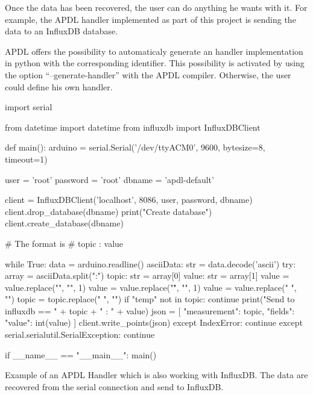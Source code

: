 Once the data has been recovered, the user can do anything he wants with it. For
example, the \gls{APDL} handler implemented as part of this project is sending
the data to an InfluxDB database\cite{InfluxData}.

APDL offers the possibility to automaticaly generate an handler implementation
in python with the corresponding identifier. This possibility is activated by
using the option ``--generate-handler'' with the \gls{APDL} compiler. Otherwise,
the user could define his own handler.

\begin{listing}[ht]
  \centering
\begin{pythoncode}
import serial

from datetime import datetime
from influxdb import InfluxDBClient


def main():
    arduino = serial.Serial('/dev/ttyACM0', 9600, bytesize=8, timeout=1)

    user = 'root'
    password = 'root'
    dbname = 'apdl-default'

    client = InfluxDBClient('localhost', 8086, user, password, dbname)
    client.drop_database(dbname)
    print("Create database")
    client.create_database(dbname)

    # The format is
    # topic : value

    while True:
        data = arduino.readline()
        asciiData: str = data.decode('ascii')
        try:
            array = asciiData.split(":")
            topic: str = array[0]
            value: str = array[1]
            value = value.replace("\n", "", 1)
            value = value.replace("\r", "", 1)
            value = value.replace(" ", "")
            topic = topic.replace(" ", "")
            if "temp" not in topic:
                continue
            print("Send to influxdb == " + topic + " : " + value)
            json = [
                {
                    "measurement": topic,
                    "fields": {
                        "value": int(value)
                    }
                }
            ]
            client.write_points(json)
        except IndexError:
            continue
        except serial.serialutil.SerialException:
            continue

if __name__ == "__main__":
    main()
\end{pythoncode}
  \caption[Example of an APDL Serial Handler with InfluxDB]{Example of an
\gls{APDL} Handler which is also working with InfluxDB. The data are recovered
from the serial connection and send to InfluxDB.}
  \label{lst:handler_python_example}
\end{listing}

